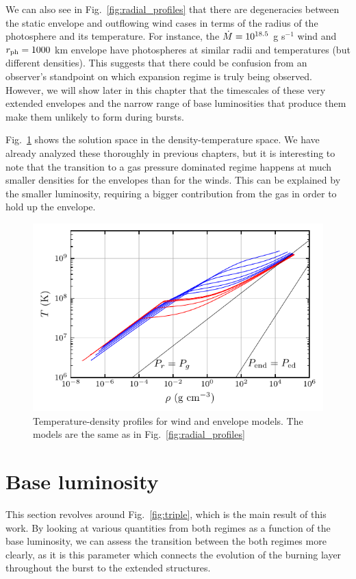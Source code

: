 \documentclass[../main.tex]{subfiles}
\begin{document}
We can also see in Fig.~\ref{fig:radial_profiles} that there are degeneracies between the static envelope and outflowing wind cases in terms of the radius of the photosphere and its temperature. For instance, the $\dot{M}=10^{18.5}$ g s$^{-1}$ wind and $r_\text{ph}=1000$ km envelope have photospheres at similar radii and temperatures (but different densities). This suggests that there could be confusion from an observer's standpoint on which expansion regime is truly being observed. However, we will show later in this chapter that the timescales of these very extended envelopes and the narrow range of base luminosities that produce them make them unlikely to form during bursts. 

Fig.~\ref{fig:rho_T} shows the solution space in the density-temperature space. We have already analyzed these thoroughly in previous chapters, but it is interesting to note that the transition to a gas pressure dominated regime happens at much smaller densities for the envelopes than for the winds. This can be explained by the smaller luminosity, requiring a bigger contribution from the gas in order to hold up the envelope.

\begin{figure}[htb!]
    \centering
    \includegraphics{figures/rho_T.pdf}
    \caption[Temperature-density profiles of winds and envelopes]{Temperature-density profiles for wind and envelope models. The models are the same as in Fig.~\ref{fig:radial_profiles}}
    \label{fig:rho_T}
\end{figure}

\section{Base luminosity}\label{sec:compare_Lb}
This section revolves around Fig.~\ref{fig:triple}, which is the main result of this work. By looking at various quantities from both regimes as a function of the base luminosity, we can assess the transition between the both regimes more clearly, as it is this parameter which connects the evolution of the burning layer throughout the burst to the extended structures. 
\end{document}
